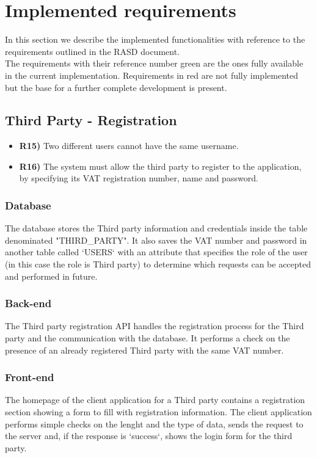 \section{Implemented requirements}

In this section we describe the implemented functionalities with reference to the requirements outlined in the RASD document.\\
The requirements with their reference number green are the ones fully available in the current implementation. 
Requirements in red are not fully implemented but the base for a further complete development is present.

\subsection{Third Party - Registration}
\begin{itemize}
	\item {\color{Green}\textbf{R15)}} Two different users cannot have the same username.
	\item {\color{Green}\textbf{R16)}} The system must allow the third party to register to the application, by specifying its VAT registration number, name and password.
\end{itemize}

\subsubsection*{Database}
The database stores the Third party information and credentials inside the table denominated "THIRD\_PARTY". It also saves the VAT number and password in another table called `USERS` with an attribute that specifies the role of the user (in this case the role is Third party) to determine which requests can be accepted and performed in future.\\

\subsubsection*{Back-end}
The Third party registration API handles the registration process for the Third party and the communication with the database. It performs a check on the presence of an already registered Third party with the same VAT number.

\subsubsection*{Front-end}
The homepage of the client application for a Third party contains a registration section showing a form to fill with registration information. The client application performs simple checks on the lenght and the type of data, sends the request to the server and, if the response is `success`,  shows the login form for the third party.

